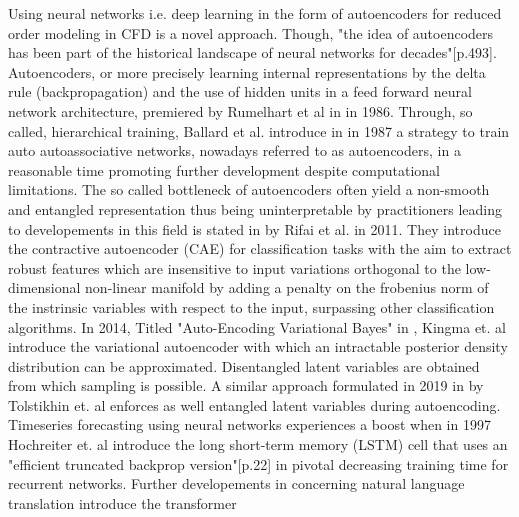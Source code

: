 Using neural networks i.e. deep learning in the form of autoencoders for reduced order modeling in CFD is a novel approach. Though, "the idea of autoencoders has been part of the historical landscape of neural networks for decades"\cite{Goodfellow}[p.493]. Autoencoders, or more precisely learning internal representations by the delta rule (backpropagation) and the use of hidden units in a feed forward neural network architecture, premiered by Rumelhart et al in \cite{Rumelhart} in 1986. Through, so called, hierarchical training, Ballard et al. introduce in  \cite{Ballard} in 1987 a strategy to train auto autoassociative networks, nowadays referred to as autoencoders, in a reasonable time promoting further development despite computational limitations. The so called bottleneck of autoencoders often yield a non-smooth and entangled representation thus being uninterpretable by practitioners leading to developements in this field is stated in \cite{Rifai2011} by Rifai et al. in 2011. They introduce the contractive autoencoder (CAE) for classification tasks with the aim to extract robust features which are insensitive to input variations orthogonal to the low-dimensional non-linear manifold by adding a penalty on the frobenius norm of the instrinsic variables with respect to the input, surpassing other classification algorithms. In 2014, Titled "Auto-Encoding Variational Bayes" in \cite{kingma2014autoencoding}, Kingma et. al introduce the variational autoencoder with which an intractable posterior density distribution can be approximated. Disentangled latent variables are obtained from which sampling is possible. A similar approach formulated in 2019 in \cite{tolstikhin2019wasserstein} by Tolstikhin et. al enforces as well entangled latent variables during autoencoding. Timeseries forecasting using neural networks experiences a boost when in 1997 Hochreiter et. al introduce the long short-term memory (LSTM) cell that uses an "efficient truncated backprop version"[p.22] in \cite{HochSchm97} pivotal decreasing training time for recurrent networks. Further developements in concerning natural language translation introduce the transformer  

